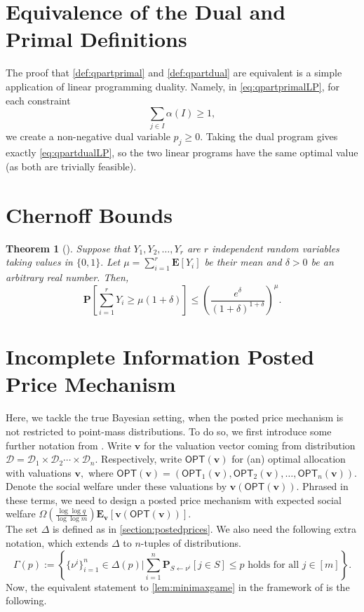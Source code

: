 \documentclass[11pt]{article}\usepackage{amsfonts}
\newtheorem{theorem}{Theorem}
\numberwithin{theorem}{subsection}
\newcommand{\prob}{\mathbf{P}}
\newcommand{\boldv}{\mathbf{v}}
\newcommand{\opt}{\mathsf{OPT}}
\newcommand{\expect}{\mathbf{E}}
\begin{document}
\section{Equivalence of the Dual and Primal Definitions}
\label{section:definitionequivalence}
The proof that \cref{def:qpartprimal} and \cref{def:qpartdual} are equivalent is a simple application of 
linear programming duality. Namely, in \cref{eq:qpartprimalLP}, for each constraint 
$$
\sum_{j \in I}
\alpha(I)\ge 1, 
$$
we create a non-negative dual variable $p_j \ge 0.$ Taking the dual program gives exactly 
\cref{eq:qpartdualLP}, so the two linear programs have the same optimal value (as both are trivially feasible).


\section{Chernoff Bounds}
\begin{theorem}[{\cite[Theorem 4.4]{Mitzenmacher05}}]
\label{thm:chernoff}
Suppose that $Y_1, Y_2, \ldots, Y_r$ are $r$ independent random variables taking values in $\{0,1\}.$ Let $\mu = \sum_{i=1}^r \expect[Y_i]$ be their mean and $\delta>0$ be an arbitrary real number. Then,
$$
\prob\left[\sum_{i = 1}^r Y_i \ge \mu(1 + \delta)\right]
\le 
\left(
\frac{e^\delta}{(1+\delta)^{1+\delta}}
\right)^{\mu}.
$$
\end{theorem}

\section{Incomplete Information Posted Price Mechanism}\label{sec:incompleteposted}
Here, we tackle the true Bayesian setting, when the posted price mechanism is not restricted to point-mass distributions. To do so, we first introduce some further notation from \cite{DuttingKL20}. Write $\boldv$ for the valuation vector coming from distribution $\mathcal{D} = \mathcal{D}_1\times \mathcal{D}_2\cdots\times\mathcal{D}_n.$ Respectively, write $\opt(\boldv)$ for (an) optimal allocation with valuations $\boldv,$ where $\opt(\boldv) =  (\opt_1(\boldv),\opt_2(\boldv),\ldots, \opt_n(\boldv)).$ Denote the social welfare under these valuations by $\boldv(\opt(\boldv)).$ Phrased in these terms, we need to design a posted price mechanism with expected social welfare $\Omega\left(\frac{\log \log q}{\log \log m}\right)\expect_\boldv[\boldv(\opt(\boldv))].$\\

\noindent
The set $\Delta$ is defined as in \cref{section:postedprices}. We also need the following extra notation, which extends $\Delta$ to $n$-tuples of distributions.
$$
\Gamma(p):=
\left\{\{\nu^i\}_{i=1}^n \in \Delta(p)| \sum_{i=1}^n 
\prob_{S\longleftarrow \nu^i}[j \in S]\le p \text{ holds for all }j \in [m]\right\}.
$$
Now, the equivalent statement to 
\cref{lem:minimaxgame} in the framework of 
\cite{DuttingKL20}
is the following.
\end{document}
